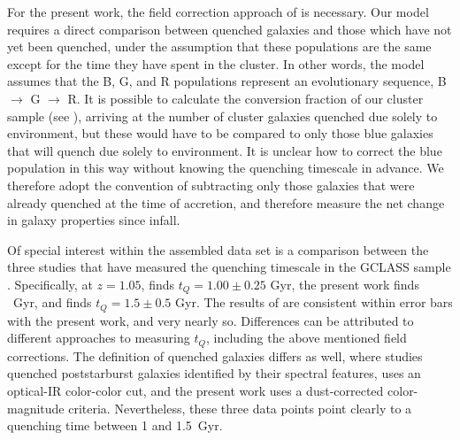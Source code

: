 For the present work, the field correction approach of \citet{Wetzel:2013aa} is necessary.
Our model requires a direct comparison between quenched galaxies and those which have not yet been quenched, under the assumption that these populations are the same except for the time they have spent in the cluster.
In other words, the model assumes that the B, G, and R populations represent an evolutionary sequence, B $\rightarrow$ G $\rightarrow$ R.
It is possible to calculate the conversion fraction of our cluster sample (see \citealt{Nantais:2016aa,Nantais:2017aa}), arriving at the number of cluster galaxies quenched due solely to environment, but these would have to be compared to only those blue galaxies that will quench due solely to environment.
It is unclear how to correct the blue population in this way without knowing the quenching timescale in advance.
We therefore adopt the convention of subtracting only those galaxies that were already quenched at the time of accretion, and therefore measure the net change in galaxy properties since infall.

Of special interest within the assembled data set is a comparison between the three studies that have measured the quenching timescale in the GCLASS sample \citep[][and the present work]{Muzzin:2014aa,Balogh:2016aa}.
Specifically, at $z=1.05$, \citet{Muzzin:2014aa} finds $t_Q=1.00\pm0.25$ Gyr, the present work finds \gresult~Gyr, and \citet{Balogh:2016aa} finds $t_Q=1.5 \pm 0.5$ Gyr.
The results of \citet{Balogh:2016aa} are consistent within error bars with the present work, and \citet{Muzzin:2014aa} very nearly so.
Differences can be attributed to different approaches to measuring $t_Q$, including the above mentioned field corrections.
The definition of quenched galaxies differs as well, where \citet{Muzzin:2014aa} studies quenched poststarburst galaxies identified by their spectral features, \citet{Balogh:2016aa} uses an optical-IR color-color cut, and the present work uses a dust-corrected color-magnitude criteria.
Nevertheless, these three data points point clearly to a quenching time between 1 and 1.5~Gyr.



